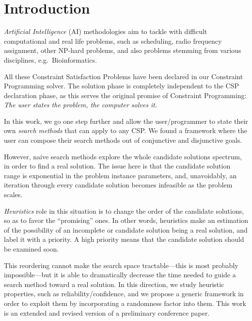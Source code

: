 \documentclass{ws-ijait}
\begin{document}


\section{Introduction}

\emph{Artificial Intelligence} (AI) methodologies aim to
tackle with difficult computational and real life problems,
such as scheduling,\cite{Pinedo2012} radio frequency
assignment,\cite{Cabon1999} other NP-hard problems, and also
problems stemming from various disciplines, e.g.\ 
Bioinformatics.\cite{Barahona2011}

All these Constraint Satisfaction Problems have been
declared in our Constraint Programming solver.\cite{Naxos}
The solution phase is completely independent to the CSP
declaration phase, as this serves the original promise of
Constraint Programming: \emph{The user states the problem,
the computer solves it.}\cite{Freuder2014}

In this work, we go one step further and allow the
user\slash programmer to state their own \emph{search
methods} that can apply to any CSP. We found a framework
where the user can compose their search methods out of
conjunctive and disjunctive goals.

However, naive search methods explore the whole candidate
solutions spectrum, in order to find a real solution. The
issue here is that the candidate solution range is
exponential in the problem instance parameters, and,
unavoidably, an iteration through every candidate solution
becomes infeasible as the problem scales.

\emph{Heuristics} role in this situation is to change the
order of the candidate solutions, so as to favor the
``promising'' ones. In other words, heuristics make an
estimation of the possibility of an incomplete or candidate
solution being a real solution, and label it with a
priority. A high priority means that the candidate solution
should be examined soon.

This reordering cannot make the search space
tractable---this is most probably
impossible\cite{Fortnow2009}---but it is able to
dramatically decrease the time needed to guide a search
method toward a real solution. In this direction, we study
heuristic properties, such as reliability\slash confidence,
and we propose a generic framework in order to exploit them
by incorporating a randomness factor into them. This work is
an extended and revised version of a preliminary conference
paper.\cite{Pothitos2016-PoPS}
\end{document}

